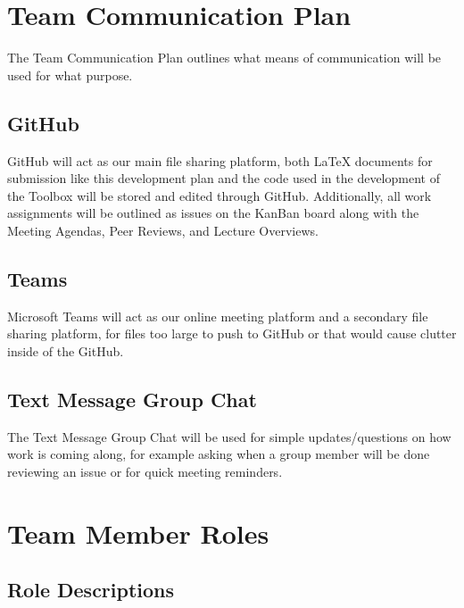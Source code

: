 \documentclass{article}
\begin{document}
\section{Team Communication Plan}
The Team Communication Plan outlines what means of communication will be used for what purpose.
\subsection{GitHub}
GitHub will act as our main file sharing platform, both LaTeX documents for submission like this development plan and the code used in the development of the Toolbox will be stored and edited through GitHub. 
Additionally, all work assignments will be outlined as issues on the KanBan board along with the Meeting Agendas, Peer Reviews, and Lecture Overviews.
\subsection{Teams}
Microsoft Teams will act as our online meeting platform and a secondary file sharing platform, for files too large to push to GitHub or that would cause clutter inside of the GitHub.
\subsection{Text Message Group Chat}
The Text Message Group Chat will be used for simple updates/questions on how work is coming along, for example asking when a group member will be done reviewing an issue or for quick meeting reminders. 


\section{Team Member Roles}

\subsection{Role Descriptions}
\end{document}
